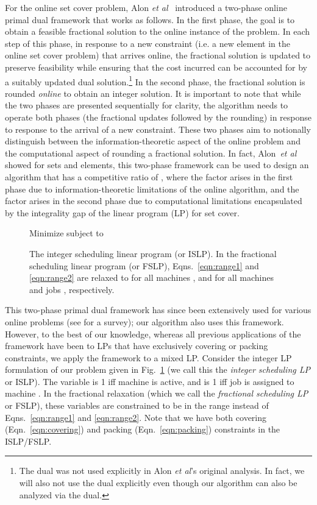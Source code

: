 \documentclass[11pt]{article}
\begin{document}
For the online set cover problem, Alon {\em et al}~\cite{AlonAABN09} introduced 
a two-phase online primal dual framework that works as follows. In the first 
phase, the goal is to obtain a feasible fractional solution to the online 
instance of the problem. In each step of this phase, in response to a new 
constraint (i.e. a new element in the online set cover problem) 
that arrives online, the fractional solution is updated to preserve 
feasibility while ensuring that the cost incurred can be accounted for by a 
suitably updated dual solution.\footnote{The dual was not used explicitly in Alon 
{\em et al}'s original analysis. In fact, we will also not use the dual explicitly
even though our algorithm can also be analyzed via the dual.}
In the second phase, the fractional solution is rounded {\em online} to obtain 
an integer solution. It is important to note that while the two phases are presented
sequentially for clarity, the algorithm needs to operate both phases (the fractional
updates followed by the rounding) in response
to response to the arrival of a new constraint. 
These two phases aim to notionally distinguish between 
the information-theoretic aspect of the online problem and the computational aspect
of rounding a fractional solution. In fact, Alon~{\em et al} showed 
for  sets and  elements, this two-phase framework can be used to 
design an algorithm that has a competitive ratio of , where the 
 factor arises in the first phase due to information-theoretic
limitations of the online algorithm, and the  factor arises in the
second phase due to computational limitations encapsulated by the integrality
gap of the linear program (LP) for set cover.

\begin{figure}[!htb]
	\centering
	\small
	Minimize  subject to
	
	\caption{\small The integer scheduling linear program (or ISLP). In the fractional scheduling linear
		program (or FSLP), Eqns.~\ref{eqn:range1} and \ref{eqn:range2} are relaxed to 
		for all machines , and  for all machines  and jobs , 
		respectively.}
	\label{fig:lp}
\end{figure}

This two-phase primal dual framework has since been extensively  
used for various online problems (see \cite{BuchbinderN09b} for a survey);
our algorithm also uses this framework. However, to the best of our knowledge,
whereas all previous applications of the framework have been to LPs that have 
exclusively covering or packing constraints, we apply the framework to a mixed LP. 
Consider the integer LP formulation of our problem 
given in Fig.~\ref{fig:lp} (we call this the {\em integer scheduling LP} or ISLP). 
The variable  is 1 iff machine  is active, 
and  is 1 iff job  is assigned to machine . In the fractional
relaxation (which we call the {\em fractional scheduling LP} or FSLP), 
these variables are constrained to be in the range  
instead of Eqns.~\ref{eqn:range1} and \ref{eqn:range2}. 
Note that we have both covering 
(Eqn.~\ref{eqn:covering}) and packing (Eqn.~\ref{eqn:packing}) constraints
in the ISLP/FSLP.
\end{document}
